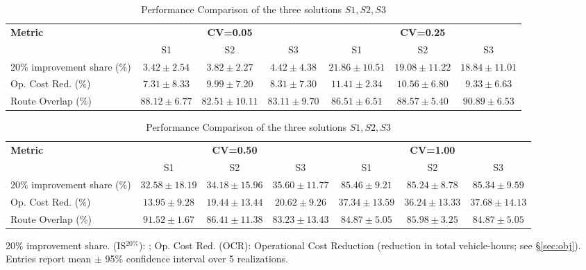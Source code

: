 \documentclass[a4paper,fleqn]{cas-sc}
\begin{document}
\begin{table}
\centering
\scriptsize
\setlength{\tabcolsep}{2.5pt}
\begin{threeparttable}

\begin{tabular}{lcccccc}
\toprule
\textbf{Metric} 
  & \multicolumn{3}{c}{\textbf{CV=0.05}} 
  & \multicolumn{3}{c}{\textbf{CV=0.25}} \\
\cmidrule(lr){2-4} \cmidrule(lr){5-7}
& S1 & S2 & S3 & S1 & S2 & S3 \\
\midrule
20\% improvement share (\%) 
  & $3.42\pm2.54$ & $3.82\pm2.27$ & $4.42\pm4.38$ 
  & $21.86\pm10.51$ & $19.08\pm11.22$ & $18.84\pm11.01$ \\
Op. Cost Red. (\%) 
  & $7.31\pm8.33$ & $9.99\pm7.20$ & $8.31\pm7.30$ 
  & $11.41\pm2.34$ & $10.56\pm6.80$ & $9.33\pm6.63$ \\
Route Overlap (\%) 
  & $88.12\pm6.77$ & $82.51\pm10.11$ & $83.11\pm9.70$ 
  & $86.51\pm6.51$ & $88.57\pm5.40$ & $90.89\pm6.53$ \\
\bottomrule
\end{tabular}

\vspace{0.5em}

\begin{tabular}{lcccccc}
\toprule
\textbf{Metric} 
  & \multicolumn{3}{c}{\textbf{CV=0.50}} 
  & \multicolumn{3}{c}{\textbf{CV=1.00}} \\
\cmidrule(lr){2-4} \cmidrule(lr){5-7}
& S1 & S2 & S3 & S1 & S2 & S3 \\
\midrule
20\% improvement share (\%) 
  & $32.58\pm18.19$ & $34.18\pm15.96$ & $35.60\pm11.77$ 
  & $85.46\pm9.21$ & $85.24\pm8.78$ & $85.34\pm9.59$ \\
Op. Cost Red. (\%) 
  & $13.95\pm9.28$ & $19.44\pm13.44$ & $20.62\pm9.26$ 
  & $37.34\pm13.59$ & $36.24\pm13.33$ & $37.68\pm14.13$ \\
Route Overlap (\%) 
  & $91.52\pm1.67$ & $86.41\pm11.38$ & $83.23\pm13.43$ 
  & $84.87\pm5.05$ & $85.98\pm3.25$ & $84.87\pm5.05$ \\
\bottomrule
\end{tabular}

\begin{tablenotes}
\item 20\% improvement share. (IS$^{20\%}$): ;
Op. Cost Red. (OCR): Operational Cost Reduction (reduction in total vehicle-hours; see \S\ref{sec:obj}).
Entries report mean $\pm$ 95\% confidence interval over 5 realizations.
\end{tablenotes}

\end{threeparttable}
\caption{Performance Comparison of the three solutions $S1, S2, S3$}
\label{tab:randomSEED}
\end{table}
\end{document}
